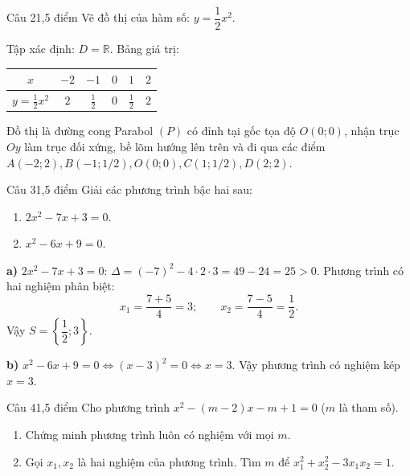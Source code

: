 \begin{de_cau}{Câu 2}{1,5 điểm}
Vẽ đồ thị của hàm số: $y = \dfrac{1}{2}x^2$.
\end{de_cau}

\begin{loi_giai_cau}
Tập xác định: $D = \mathbb{R}$.
Bảng giá trị:
\begin{center}
\begin{tabular}{|c|c|c|c|c|c|}
\hline
$x$ & $-2$ & $-1$ & $0$ & $1$ & $2$ \\ \hline
$y = \frac{1}{2}x^2$ & $2$ & $\frac{1}{2}$ & $0$ & $\frac{1}{2}$ & $2$ \\ \hline
\end{tabular}
\end{center}
Đồ thị là đường cong Parabol $(P)$ có đỉnh tại gốc tọa độ $O(0; 0)$, nhận trục $Oy$ làm trục đối xứng, bề lõm hướng lên trên và đi qua các điểm $A(-2; 2), B(-1; 1/2), O(0; 0), C(1; 1/2), D(2; 2)$.
\end{loi_giai_cau}

\begin{de_cau}{Câu 3}{1,5 điểm}
Giải các phương trình bậc hai sau:
\begin{enumerate}[label=\alph*)]
\item $2x^2 - 7x + 3 = 0$.
\item $x^2 - 6x + 9 = 0$.
\end{enumerate}
\end{de_cau}

\begin{loi_giai_cau}
\textbf{a)} $2x^2 - 7x + 3 = 0$:
$\Delta = (-7)^2 - 4 \cdot 2 \cdot 3 = 49 - 24 = 25 > 0$.
Phương trình có hai nghiệm phân biệt:
\[x_1 = \frac{7 + 5}{4} = 3;\qquad x_2 = \frac{7 - 5}{4} = \frac{1}{2}.\]
Vậy $\boxed{S = \left\{\dfrac{1}{2}; 3\right\}}$.

\textbf{b)} $x^2 - 6x + 9 = 0 \iff (x-3)^2 = 0 \iff x = 3$.
Vậy phương trình có nghiệm kép $\boxed{x = 3}$.
\end{loi_giai_cau}

\begin{de_cau}{Câu 4}{1,5 điểm}
Cho phương trình $x^2 - (m-2)x - m + 1 = 0$ ($m$ là tham số).
\begin{enumerate}[label=\alph*)]
\item Chứng minh phương trình luôn có nghiệm với mọi $m$.
\item Gọi $x_1, x_2$ là hai nghiệm của phương trình. Tìm $m$ để $x_1^2 + x_2^2 - 3x_1 x_2 = 1$.
\end{enumerate}
\end{de_cau}

